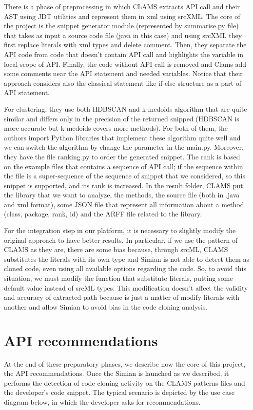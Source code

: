 There is a phase of preprocessing in which CLAMS extracts API call and their AST using JDT utilities and represent them in xml using srcXML. The core of the project is the snippet generator module (represented by summarise.py file) that takes as input a source code file (java in this case) and using srcXML they first replace literals with xml types and delete comment. Then, they separate the API code from code that doesn't contain API call and highlights the variable in local scope of API. Finally, the code without API call is removed and Clams add some comments near the API statement and needed variables. Notice that their approach considers also the classical statement like if-else structure as a part of API statement. 

For clustering, they use both HDBSCAN and k-medoids algorithm that are quite similar and differs only in the precision of the returned snipped (HDBSCAN is more accurate but k-medoids covers more methods). For both of them, the authors import Python libraries that implement these algorithm quite well and we can switch the algorithm by change the parameter in the main.py. Moreover, they have the file ranking.py to order the generated snippet. The rank is based on the example files that contains a sequence of API call; if the sequence within the file is a super-sequence of the sequence of snippet that we considered, so this snippet is supported, and its rank is increased. In the result folder, CLAMS put the library that we want to analyze, the methods, the source file (both in .java and xml format), some JSON file that represent all information about a method (class, package, rank, id) and the ARFF file related to the library.

For the integration step in our platform, it is necessary to slightly modify the original approach to have better results. In particular, if we use the pattern of CLAMS as they are, there are some bias because, through srcML, CLAMS substitutes the literals with its own type and Simian is not able to detect them as cloned code, even using all available options regarding the code. So, to avoid this situation, we must modify the function that substitute literals, putting some default value instead of srcML types. This modification doesn't affect the validity and accuracy of extracted path because is just a matter of modify literals with another and allow Simian to avoid bias in the code cloning analysis.

\section{API recommendations}
At the end of these preparatory phases, we describe now the core of this project, the API recommendations. Once the Simian is launched as we described, it performs the detection of code cloning activity on the CLAMS patterns files and the developer's code snippet. The typical scenario is depicted by the use case diagram below, in which the developer asks for recommendations.


